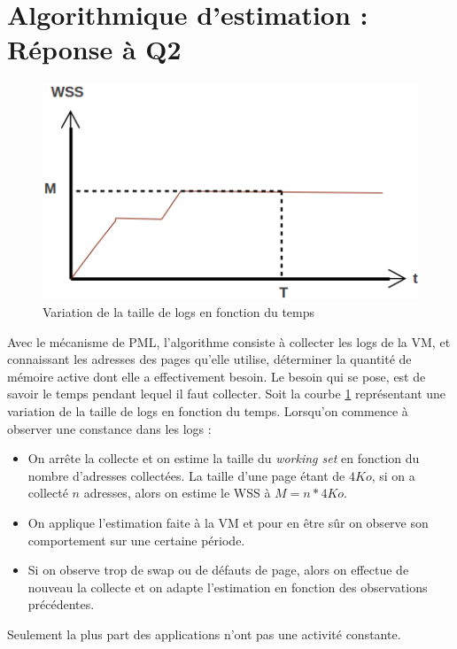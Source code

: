 \section{Algorithmique d'estimation : Réponse à Q2}
\begin{figure}[htp]
    \centering
    \includegraphics[scale=.5]{chapters/3/fig3/courbe_wss_1}
    \caption{Variation de la taille de logs en fonction du temps}
    \label{fig:courbe_wss_cst}
\end{figure}
Avec le mécanisme de PML, l'algorithme consiste à collecter les logs de la VM, et connaissant les adresses des pages qu'elle utilise, déterminer la quantité de mémoire active dont elle a effectivement besoin. Le besoin qui se pose, est de savoir le temps pendant lequel il faut collecter. Soit la courbe \ref{fig:courbe_wss_cst} représentant une variation de la taille de logs en fonction du temps. Lorsqu'on commence à observer une constance dans les logs : 
\begin{itemize}
    \item On arrête la collecte et on estime la taille du \textit{working set} en fonction du nombre d'adresses collectées. La taille d'une page étant de $4Ko$, si on a collecté $n$ adresses, alors on estime le WSS à $M = n*4 Ko$.
    \item On applique l'estimation faite à la VM et pour en être sûr on observe son comportement sur une certaine période.
    \item Si on observe trop de swap ou de défauts de page, alors on effectue de nouveau la collecte et on adapte l'estimation en fonction des observations précédentes.
\end{itemize}

\noindent Seulement la plus part des applications n'ont pas une activité constante.

